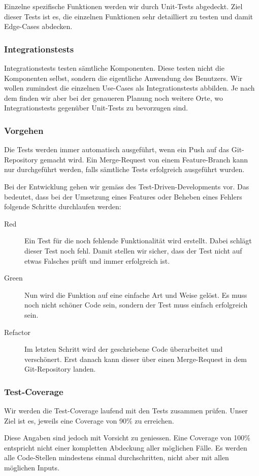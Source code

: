 \documentclass[a4paper]{article}
\begin{document}
Einzelne spezifische Funktionen werden wir durch Unit-Tests abgedeckt.
Ziel dieser Tests ist es, die einzelnen Funktionen sehr detailliert zu testen und damit Edge-Cases abdecken.

\subsubsection{Integrationstests}

Integrationstests testen sämtliche Komponenten. Diese testen nicht die Komponenten selbst, sondern die eigentliche Anwendung des Benutzers.
Wir wollen zumindest die einzelnen Use-Cases als Integrationstests abbilden. Je nach dem finden wir aber bei der genaueren Planung noch weitere Orte, wo Integrationstests gegenüber Unit-Tests zu bevorzugen sind.

\subsubsection{Vorgehen}

Die Tests werden immer automatisch ausgeführt, wenn ein Push auf das Git-Repository gemacht wird.
Ein Merge-Request von einem Feature-Branch kann nur durchgeführt werden, falls sämtliche Tests erfolgreich ausgeführt wurden.

Bei der Entwicklung gehen wir gemäss des Test-Driven-Developments vor.
Das bedeutet, dass bei der Umsetzung eines Features oder Beheben eines Fehlers folgende Schritte durchlaufen werden:

\begin{description}
  \item[Red]
    Ein Test für die noch fehlende Funktionalität wird erstellt.
    Dabei schlägt dieser Test noch fehl.
    Damit stellen wir sicher, dass der Test nicht auf etwas Falsches prüft und immer erfolgreich ist.
  \item[Green]
    Nun wird die Funktion auf eine einfache Art und Weise gelöst.
    Es muss noch nicht schöner Code sein, sondern der Test muss einfach erfolgreich sein.
  \item[Refactor]
    Im letzten Schritt wird der geschriebene Code überarbeitet und verschönert.
    Erst danach kann dieser über einen Merge-Request in dem Git-Repository landen.
\end{description}

\subsubsection{Test-Coverage}

Wir werden die Test-Coverage laufend mit den Tests zusammen prüfen.
Unser Ziel ist es, jeweils eine Coverage von 90\% zu erreichen.

Diese Angaben sind jedoch mit Vorsicht zu geniessen.
Eine Coverage von 100\% entspricht nicht einer kompletten Abdeckung aller möglichen Fälle.
Es werden alle Code-Stellen mindestens einmal durchschritten, nicht aber mit allen möglichen Inputs.
\end{document}
